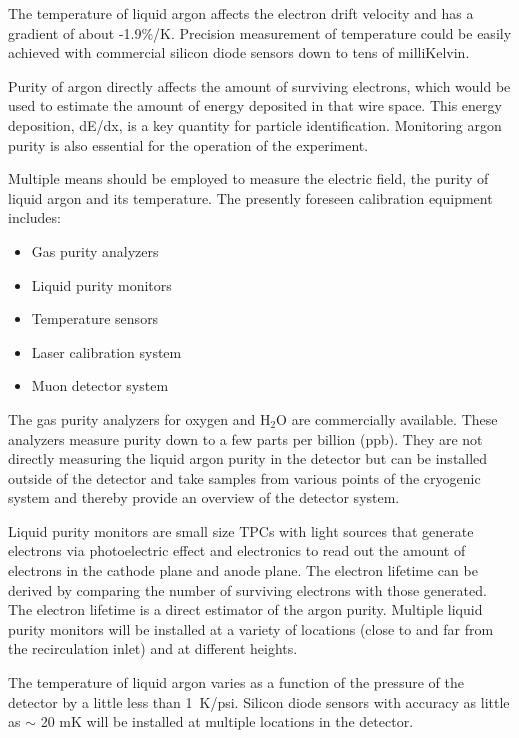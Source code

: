The temperature of liquid argon affects the electron drift velocity and has a gradient of about -1.9\%/K. Precision measurement of temperature could be easily achieved with commercial silicon diode sensors down to tens of milliKelvin. 

Purity of argon directly affects the amount of surviving electrons, which would be used to estimate the amount of energy deposited in that wire space. This energy deposition, dE/dx, is a key quantity for particle identification. Monitoring argon purity is also essential for the operation of the experiment.

Multiple means should be employed to measure the electric field, the purity of liquid argon and its temperature. 
The presently foreseen calibration equipment includes:
\begin{itemize}
\item Gas purity analyzers
\item Liquid purity monitors
\item Temperature sensors
\item Laser calibration system
\item Muon detector system
\end{itemize}

The gas purity analyzers for oxygen and H$_{2}$O are commercially available. These analyzers measure purity down to a few parts per billion (ppb). They are not directly measuring the liquid argon purity in the detector but can be installed outside of the detector and take samples from various points of the cryogenic system and thereby provide an overview of the detector system.

Liquid purity monitors are small size TPCs with light sources that generate electrons via photoelectric effect and electronics to read out the amount of electrons in the cathode plane and anode plane. The electron lifetime can be derived by comparing the number of surviving electrons with those generated. The electron lifetime is a direct estimator of the argon purity.
Multiple liquid purity monitors will be installed at a variety of locations (close to and far from the recirculation inlet) and at different heights.

The temperature of liquid argon varies as a function of the pressure of the detector by a little less than 1~K/psi.  
Silicon diode sensors with accuracy as little as $\sim$ 20 mK will be installed at multiple locations in the detector.

